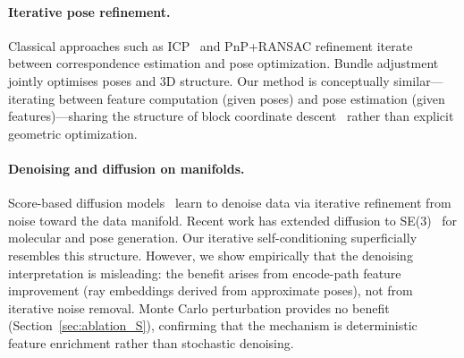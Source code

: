 \paragraph{Iterative pose refinement.} Classical approaches such as ICP~\cite{besl1992} and PnP+RANSAC refinement iterate between correspondence estimation and pose optimization. Bundle adjustment~\cite{triggs2000} jointly optimises poses and 3D structure. Our method is conceptually similar---iterating between feature computation (given poses) and pose estimation (given features)---sharing the structure of block coordinate descent~\cite{wright2015} rather than explicit geometric optimization.

\paragraph{Denoising and diffusion on manifolds.} Score-based diffusion models~\cite{song2021} learn to denoise data via iterative refinement from noise toward the data manifold. Recent work has extended diffusion to SE(3)~\cite{yim2023} for molecular and pose generation. Our iterative self-conditioning superficially resembles this structure. However, we show empirically that the denoising interpretation is misleading: the benefit arises from encode-path feature improvement (ray embeddings derived from approximate poses), not from iterative noise removal. Monte Carlo perturbation provides no benefit (Section~\ref{sec:ablation_S}), confirming that the mechanism is deterministic feature enrichment rather than stochastic denoising.
